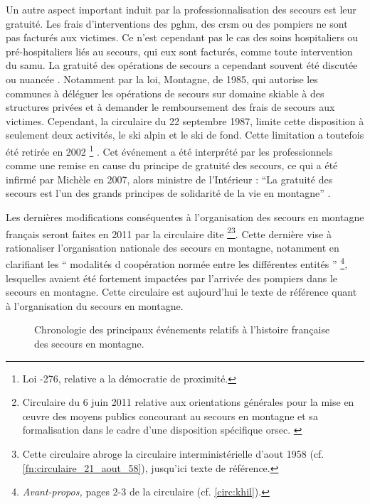 Un autre aspect important induit par la professionnalisation des
secours est leur gratuité. Les frais d'interventions des \ac{pghm},
des \ac{crsm} ou des pompiers ne sont pas facturés aux victimes. Ce
n'est cependant pas le cas des soins hospitaliers ou pré-hospitaliers
liés au secours, qui eux sont facturés, comme toute intervention du
\ac{samu}. La gratuité des opérations de secours a cependant souvent
été discutée ou nuancée \autocite{CFDLD, Halle2007,
  Magne2017}. Notamment par la loi, Montagne, de 1985, qui autorise
les communes à déléguer les opérations de secours sur domaine skiable
à des structures privées et à demander le remboursement des frais de
secours aux victimes. Cependant, la circulaire du 22 septembre 1987,
limite cette disposition à seulement deux activités, le ski alpin et
le ski de fond. Cette limitation a toutefois été retirée en 2002
\footnote{Loi -276, relative a la démocratie de proximité.}
\autocite{Magne2017}. Cet événement a été interprété par les
professionnels comme une remise en cause du principe de gratuité des
secours, ce qui a été infirmé par Michèle  en 2007,
alors ministre de l'Intérieur : \enquote{La gratuité des secours est
  l’un des grands principes de solidarité de la vie en montagne}
\autocite{CFDLD}.

Les dernières modifications conséquentes à l’organisation des secours
en montagne français seront faites en 2011 par la circulaire dite
 \footnote{Circulaire du 6 juin 2011 relative aux
  orientations générales pour la mise en œuvre des moyens publics
  concourant au secours en montagne et sa formalisation dans le cadre
  d’une disposition spécifique
  \ac{orsec}. \label{circ:khil}}\multiplefootnoteseparator\footnote{Cette
  circulaire abroge la circulaire interministérielle d'aout 1958
  (cf. \autoref{fn:circulaire_21_aout_58}), jusqu'ici texte de
  référence.}. Cette dernière vise à rationaliser l'organisation
nationale des secours en montagne, notamment en clarifiant les
\enquote{\textelp{} modalités d coopération normée entre
  les différentes entités \textelp{}} \footnote{\emph{Avant-propos,}
  pages 2-3 de la circulaire  (cf. \autoref{circ:khil}).},
lesquelles avaient été fortement impactées par l'arrivée des pompiers
dans le secours en montagne. Cette circulaire est aujourd'hui le texte
de référence quant à l'organisation du secours en montagne.

\begin{figure}
  \centering
   
   \caption{Chronologie des principaux événements relatifs à
     l'histoire française des secours en montagne.}
  \label{fig:frise_chronologique}
\end{figure}

